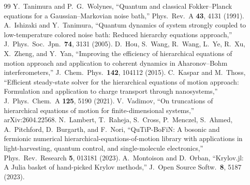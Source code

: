 \documentclass[11pt,a4paper]{article}
\begin{document}
\begin{thebibliography}{99}
 Y.~Tanimura and P.~G.~Wolynes, ``Quantum and classical Fokker--Planck equations for a Gaussian--Markovian noise bath,'' Phys.\ Rev.\ A \textbf{43}, 4131 (1991).
 A.~Ishizaki and Y.~Tanimura, ``Quantum dynamics of system strongly coupled to low-temperature colored noise bath: Reduced hierarchy equations approach,'' J.\ Phys.\ Soc.\ Jpn.\ \textbf{74}, 3131 (2005).
 D.~Hou, S.~Wang, R.~Wang, L.~Ye, R.~Xu, X.~Zheng, and Y.~Yan, ``Improving the efficiency of hierarchical equations of motion approach and application to coherent dynamics in Aharonov--Bohm interferometers,'' J.\ Chem.\ Phys.\ \textbf{142}, 104112 (2015).
 C.~Kaspar and M.~Thoss, ``Efficient steady-state solver for the hierarchical equations of motion approach: Formulation and application to charge transport through nanosystems,'' J.\ Phys.\ Chem.\ A \textbf{125}, 5190 (2021).
 V.~Vadimov, ``On truncations of hierarchical equations of motion for finite-dimensional systems,'' arXiv:2604.22568.
 N.~Lambert, T.~Raheja, S.~Cross, P.~Menczel, S.~Ahmed, A.~Pitchford, D.~Burgarth, and F.~Nori, ``QuTiP-BoFiN: A bosonic and fermionic numerical hierarchical-equations-of-motion library with applications in light-harvesting, quantum control, and single-molecule electronics,'' Phys.\ Rev.\ Research \textbf{5}, 013181 (2023).
 A.~Montoison and D.~Orban, ``Krylov.jl: A Julia basket of hand-picked Krylov methods,'' J.\ Open Source Softw.\ \textbf{8}, 5187 (2023).
\end{thebibliography}
\end{document}
